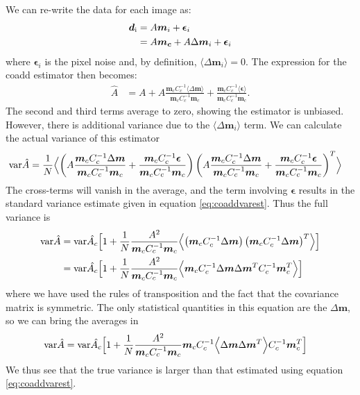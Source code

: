 \documentclass[a4paper,fleqn,usenatbib,referee]{mnras}
\begin{document}
We can re-write the data for each image as:
\begin{align}
    \boldsymbol{d}_{\rm i} &= A \boldsymbol{m}_i + \boldsymbol{\epsilon}_i\\
    &= A \boldsymbol{m_c} + A \Delta\boldsymbol{ m}_i + \boldsymbol{\epsilon}_i
\end{align}
where $\boldsymbol{\epsilon}_i$ is the pixel noise and, by definition,
$\langle\Delta\boldsymbol{m}_i\rangle= 0$. The expression for the coadd
estimator then becomes:
\begin{align}
    \hat{A} &= A + A \frac{\boldsymbol{m}_c C_c^{-1} \langle \Delta \boldsymbol{m} \rangle}{\boldsymbol{m}_c C_c^{-1}\boldsymbol{m}_c} 
              + \frac{\boldsymbol{m}_c C_c^{-1} \langle \boldsymbol{\epsilon} \rangle}{\boldsymbol{m}_c C_c^{-1}\boldsymbol{m}_c}.
\end{align}
The second and third terms average to zero, showing the estimator is unbiased.  However,
there is additional variance due to the $\langle\Delta\boldsymbol{m}_i\rangle$ term. We can
calculate the actual variance of this estimator
\begin{align}
    {\rm var}\hat{A} &= \frac{1}{N}\Bigl< \left(A \frac{\boldsymbol{m}_c C_c^{-1} \Delta \boldsymbol{m}}{\boldsymbol{m}_c C_c^{-1}\boldsymbol{m}_c} 
              + \frac{\boldsymbol{m}_c C_c^{-1} \boldsymbol{\epsilon} }{\boldsymbol{m}_c C_c^{-1}\boldsymbol{m}_c}\right)
              \left(A \frac{\boldsymbol{m}_c C_c^{-1} \Delta \boldsymbol{m}}{\boldsymbol{m}_c C_c^{-1}\boldsymbol{m}_c} 
              + \frac{\boldsymbol{m}_c C_c^{-1} \boldsymbol{\epsilon} }{\boldsymbol{m}_c C_c^{-1}\boldsymbol{m}_c}\right)^T \Bigr>
\end{align}
The cross-terms will vanish in the average, and the term involving $\boldsymbol
\epsilon$ results in the standard variance estimate given in equation
\ref{eq:coaddvarest}. Thus the full variance is
\begin{align} 
    {\rm var}\hat{A} &= {\rm var}\hat{A_c} \Bigl[ 1 + 
        \frac{1}{N}\frac{A^2}{\boldsymbol{m}_c C_c^{-1}\boldsymbol{m}_c} \Bigl< \left(\boldsymbol{m}_c C_c^{-1} \Delta \boldsymbol{m} \right)  \left(\boldsymbol{m}_c C_c^{-1} \Delta \boldsymbol{m} \right)^T \Bigr> \Bigr] \\
        &= {\rm var}\hat{A_c} \Bigl[ 1 + \frac{1}{N}\frac{A^2}{\boldsymbol{m}_c C_c^{-1}\boldsymbol{m}_c} \Bigl< \boldsymbol{m}_c C_c^{-1} \Delta \boldsymbol{m} \Delta \boldsymbol{m}^T  C_c^{-1} \boldsymbol{m}_c^T  \Bigr> \Bigr]
\end{align}
where we have used the rules of transposition and the fact that the covariance matrix is symmetric.
The only statistical quantities in this equation are the $\Delta \boldsymbol{m}$, so we can bring
the averages in
\begin{align}
    {\rm var}\hat{A} &= {\rm var}\hat{A_c} \Bigl[ 1 + \frac{1}{N}\frac{A^2}{\boldsymbol{m}_c C_c^{-1}\boldsymbol{m}_c} \boldsymbol{m}_c C_c^{-1} \Bigl< \Delta \boldsymbol{m} \Delta \boldsymbol{m}^T \Bigr>  C_c^{-1} \boldsymbol{m}_c^T  \Bigr]
\end{align}
We thus see that the true variance is larger than that estimated using
equation \ref{eq:coaddvarest}.
\end{document}

